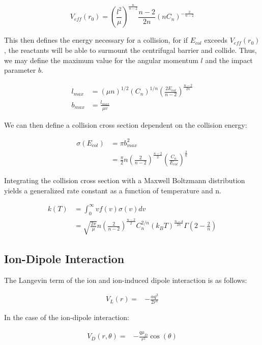 \begin{equation}
    V_{eff}(r_0) = \left(\frac{l^2}{\mu}\right)^{\frac{n}{n-2}} \frac{n-2}{2n}(n C_n)^{-\frac{2}{n-2}}
\end{equation}

This then defines the energy necessary for a collision, for if $E_{col}$ exceeds $V_{eff}(r_0)$, the reactants will be able to surmount the centrifugal barrier and collide. Thus, we may define the maximum value for the angular momentum $l$ and the impact parameter $b$.

\begin{align*}
    l_{max} & = (\mu n)^{1/2}(C_n)^{1/n} \left(\frac{2 E_{col}}{n-2}\right)^{\frac{n-2}{2n}} \\
    b_{max} & = \frac{l_{max}}{\mu v}
\end{align*}

We can then define a collision cross section dependent on the collision energy:

\begin{align*}
    \sigma(E_{col}) & = \pi b^2_{max} \\
    & = \frac{\pi}{2} n \left(\frac{2}{n-2}\right)^{\frac{n-2}{2}} \left(\frac{C_n}{E_{col}}\right)^{\frac{2}{n}}
\end{align*}

Integrating the collision cross section with a Maxwell Boltzmann distribution yields a generalized rate constant as a function of temperature and n.

\begin{align}
    k(T) & = \int_0^{\infty} v f(v) \sigma(v) dv \label{eq: k int} \\
    & = \sqrt{\frac{2 \pi}{\mu}}n\left(\frac{2}{n-2}\right)^{\frac{n-2}{2}}C_n^{2/n}(k_B T)^{\frac{n-4}{2n}}\Gamma\left(2-\frac{2}{n}\right) \label{eq: k(T)}
\end{align}

\subsection{Ion-Dipole Interaction}

The Langevin term of the ion and ion-induced dipole interaction is as follows:

\begin{align}
V_L(r)= &-\frac{\alpha q^2}{2r^4}
\end{align}

In the case of the ion-dipole interaction:

\begin{align}
V_D(r, \theta) = & -\frac{q\mu_D}{r^2} \cos(\theta)
\end{align}

